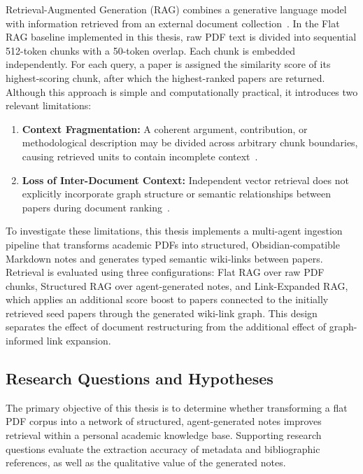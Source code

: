 \documentclass[runningheads]{llncs}
\begin{document}
Retrieval-Augmented Generation (RAG) combines a generative language model with information retrieved from an external document collection~\cite{lewis2020retrieval}. In the Flat RAG baseline implemented in this thesis, raw PDF text is divided into sequential 512-token chunks with a 50-token overlap. Each chunk is embedded independently. For each query, a paper is assigned the similarity score of its highest-scoring chunk, after which the highest-ranked papers are returned. Although this approach is simple and computationally practical, it introduces two relevant limitations:

\begin{enumerate}
\item \textbf{Context Fragmentation:} A coherent argument, contribution, or methodological description may be divided across arbitrary chunk boundaries, causing retrieved units to contain incomplete context~\cite{sarthi2024raptor}.

\item \textbf{Loss of Inter-Document Context:} Independent vector retrieval does not explicitly incorporate graph structure or semantic relationships between papers during document ranking~\cite{edge2024local,gutierrez2024hipporag}.

\end{enumerate}

To investigate these limitations, this thesis implements a multi-agent ingestion pipeline that transforms academic PDFs into structured, Obsidian-compatible Markdown notes and generates typed semantic wiki-links between papers. Retrieval is evaluated using three configurations: Flat RAG over raw PDF chunks, Structured RAG over agent-generated notes, and Link-Expanded RAG, which applies an additional score boost to papers connected to the initially retrieved seed papers through the generated wiki-link graph. This design separates the effect of document restructuring from the additional effect of graph-informed link expansion.

\subsection{Research Questions and Hypotheses}
\label{sec:rqs}

The primary objective of this thesis is to determine whether transforming a flat PDF corpus into a network of structured, agent-generated notes improves retrieval within a personal academic knowledge base. Supporting research questions evaluate the extraction accuracy of metadata and bibliographic references, as well as the qualitative value of the generated notes.
\end{document}

